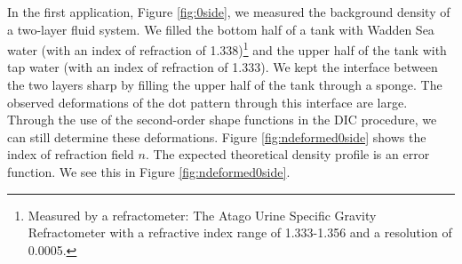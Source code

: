 \documentclass{svjour3}                     %
\begin{document}
In the first application, Figure \ref{fig:0side}, we measured the background density of a two-layer fluid system. We filled the bottom half of a tank with Wadden Sea water (with an index of refraction of 1.338)\footnote{Measured by a refractometer: The Atago Urine Specific Gravity Refractometer with a refractive index range of 1.333-1.356 and a resolution of 0.0005.} and the upper half of the tank with tap water (with an index of refraction of 1.333). We kept the interface between the two layers sharp by filling the upper half of the tank through a sponge. The observed deformations of the dot pattern through this interface are large. Through the use of the second-order shape functions in the DIC procedure, we can still determine these deformations. Figure \ref{fig:ndeformed0side} shows the index of refraction field $n$. The expected theoretical density profile is an error function. We see this in Figure \ref{fig:ndeformed0side}.
\end{document}
